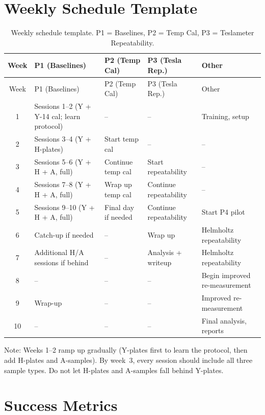 \documentclass[11pt,letterpaper]{article}
\begin{document}
\section{Weekly Schedule Template}
\label{sec:schedule}

\begin{longtable}{@{}cp{2.8cm}p{2.4cm}p{2.4cm}p{2.8cm}@{}}
\caption{Weekly schedule template. P1 = Baselines, P2 = Temp Cal, P3 = Teslameter
  Repeatability.} \label{tab:schedule} \\
\toprule
Week & P1 (Baselines) & P2 (Temp Cal) & P3 (Tesla Rep.) & Other \\
\midrule
\endfirsthead
\toprule
Week & P1 (Baselines) & P2 (Temp Cal) & P3 (Tesla Rep.) & Other \\
\midrule
\endhead
1  & Sessions 1--2 (Y + Y-14 cal; learn protocol) & -- & -- & Training, setup \\
2  & Sessions 3--4 (Y + H-plates) & Start temp cal & -- & -- \\
3  & Sessions 5--6 (Y + H + A, full) & Continue temp cal & Start repeatability & -- \\
4  & Sessions 7--8 (Y + H + A, full) & Wrap up temp cal & Continue repeatability & -- \\
5  & Sessions 9--10 (Y + H + A, full) & Final day if needed & Continue repeatability & Start P4 pilot \\
6  & Catch-up if needed & -- & Wrap up & Helmholtz repeatability \\
7  & Additional H/A sessions if behind & -- & Analysis + writeup & Helmholtz repeatability \\
8  & -- & -- & -- & Begin improved re-measurement \\
9  & Wrap-up & -- & -- & Improved re-measurement \\
10 & -- & -- & -- & Final analysis, reports \\
\bottomrule
\end{longtable}

Note: Weeks 1--2 ramp up gradually (Y-plates first to learn the protocol, then
add H-plates and A-samples). By week~3, every session should include all three
sample types. Do not let H-plates and A-samples fall behind Y-plates.


\section{Success Metrics}
\label{sec:success}
\end{document}
